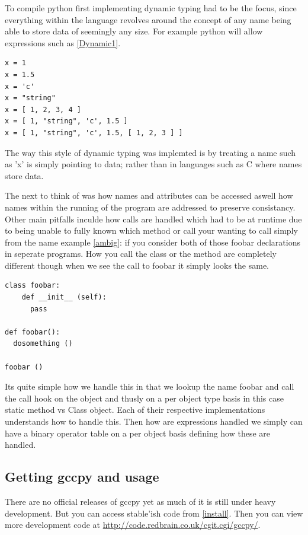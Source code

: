 \documentclass[defaultstyle,11pt]{article}
\begin{document}
To compile python first implementing dynamic typing had to be the focus, since everything
within the language revolves around the concept of any name being able to store data of seemingly
any size. For example python will allow expressions such as \ref{Dynamic1}.

\begin{lstlisting}
x = 1
x = 1.5
x = 'c'
x = "string"
x = [ 1, 2, 3, 4 ]
x = [ 1, "string", 'c', 1.5 ]
x = [ 1, "string", 'c', 1.5, [ 1, 2, 3 ] ]
\end{lstlisting}

The way this style of dynamic typing was implemted is by treating a name such as 'x' is simply pointing to
data; rather than in languages such as C where names store data.

The next to think of was how names and attributes can be accessed aswell how names within the running of the program
are addressed to preserve consistancy. Other main pitfalls inculde how calls are handled which had to be at runtime
due to being unable to fully known which method or call your wanting to call simply from the name example \ref{ambig}:
if you consider both of those foobar declarations in seperate programs. How you call the class or the method are completely
different though when we see the call to foobar it simply looks the same.

\begin{lstlisting}
class foobar:
    def __init__ (self):
      pass

def foobar():
  dosomething ()

foobar ()
\end{lstlisting}

Its quite simple how we handle this in that we lookup the name foobar and call the call hook on the object and thusly
on a per object type basis in this case static method vs Class object. Each of their respective implementations understands
how to handle this. Then how are expressions handled we simply can have a binary operator table on a per object basis defining
how these are handled.

\subsection{Getting gccpy and usage}

There are no official releases of gccpy yet as much of it is still under heavy development. But you can access stable'ish code
from \ref{install}. Then you can view more development code at \url{http://code.redbrain.co.uk/cgit.cgi/gccpy/}.
\end{document}
